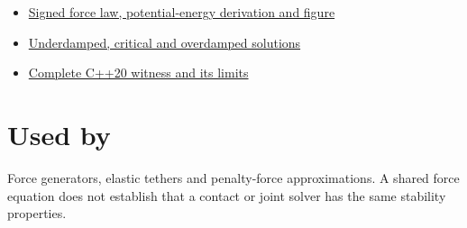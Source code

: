 \begin{itemize}
\tightlist
\item
  \href{Continuous\%20Notes/Game\%20Engine\%20-\%20From\%20First\%20Frame\%20to\%20Living\%20Worlds\#A\%20spring\%20law\%20is\%20signed,\%20not\%20just\%20a\%20magnitude}{Signed force law, potential-energy derivation and figure}
\item
  \href{Continuous\%20Notes/Game\%20Engine\%20-\%20From\%20First\%20Frame\%20to\%20Living\%20Worlds\#Solve\%20each\%20linear\%20damping\%20regime\%20with\%20its\%20own\%20form}{Underdamped, critical and overdamped solutions}
\item
  \href{Continuous\%20Notes/Game\%20Engine\%20-\%20From\%20First\%20Frame\%20to\%20Living\%20Worlds\#Standalone\%20spring-direction\%20and\%20integration-order\%20laboratory}{Complete C++20 witness and its limits}
\end{itemize}

\section{Used by}\label{appendix-e040e2108923-used-by}

Force generators, elastic tethers and penalty-force approximations. A shared force equation does not establish that a contact or joint solver has the same stability properties.
